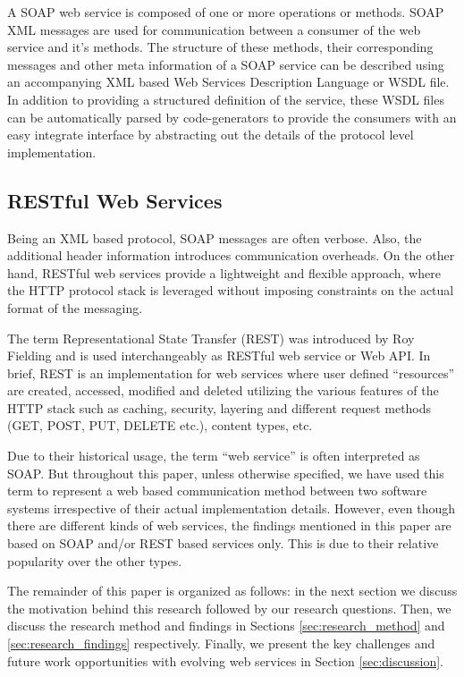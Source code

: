 \documentclass[runningheads,a4paper]{llncs}
\begin{document}
A SOAP web service is composed of one or more operations or methods. SOAP XML messages are used for communication between a consumer of the web service and it’s methods. The structure of these methods, their corresponding messages and other meta information of a SOAP service can be described using an accompanying XML based Web Services Description Language or WSDL file. In addition to providing a structured definition of the service, these WSDL files can be automatically parsed by code-generators to provide the consumers with an easy integrate interface by abstracting out the details of the protocol level implementation.


\subsection{RESTful Web Services} %
\label{sub:restful_web_services}
Being an XML based protocol, SOAP messages are often verbose. Also, the additional header information introduces communication overheads. On the other hand, RESTful web services provide a lightweight and flexible approach, where the HTTP protocol stack is leveraged without imposing constraints on the actual format of the messaging.

The term Representational State Transfer (REST) was introduced by Roy Fielding \cite{rest_wiki} and is used interchangeably as RESTful web service or Web API. In brief, REST is an implementation for web services where user defined ``resources'' are created, accessed, modified and deleted utilizing the various features of the HTTP stack such as caching, security, layering and different request methods (GET, POST, PUT, DELETE etc.), content types, etc.

Due to their historical usage, the term ``web service'' is often interpreted as SOAP. But throughout this paper, unless otherwise specified, we have used this term to represent a web based communication method between two software systems irrespective of their actual implementation details. However, even though there are different kinds of web services, the findings mentioned in this paper are based on SOAP and/or REST based services only. This is due to their relative popularity over the other types.

The remainder of this paper is organized as follows: in the next section we discuss the motivation behind this research followed by our research questions. Then, we discuss the research method and findings in Sections \ref{sec:research_method} and \ref{sec:research_findings} respectively. Finally, we present the key challenges and future work opportunities with evolving web services in Section \ref{sec:discussion}.
\end{document}
